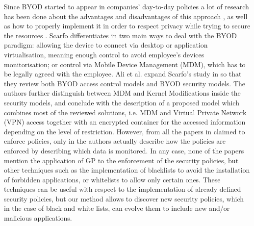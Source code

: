 \documentclass[a4paper,10pt,twocolumn,preprint,3p]{elsarticle}
\begin{document}
Since BYOD started to appear in companies' day-to-day policies  a lot
of research has been done about the advantages and disadvantages of
this approach \cite{singh2012byod}, as well as how to properly implement it in order to
respect privacy while trying to secure the resources \cite{scarfo2012new, ali2015analysis, de2015corporate}. %
 Scarfo differentiates in \cite{scarfo2012new} two main ways to deal with the BYOD paradigm: allowing the device to connect via desktop or application virtualisation, meaning enough control to avoid employee's devices monitorisation; or control via Mobile Device Management (MDM), which has to be legally agreed with the employee. Ali et al. expand Scarfo's study in \cite{ali2015analysis} so that they review both BYOD access control models and BYOD security models. The authors further distinguish between MDM and Kernel Modifications inside the security models, and conclude with the description of a proposed model which combines most of the reviewed solutions, i.e. MDM and Virtual Private Network (VPN) access together with an encrypted container for the accessed information depending on the level of restriction. However, from all the papers in \cite{ali2015analysis} claimed to enforce policies, only in \cite{rhee2013high} the authors actually describe how the policies are enforced by describing which data is monitored. In any case, none of the papers mention the application of GP to the enforcement of the security policies, but other techniques such as the implementation of blacklists to avoid the installation of forbidden applications, or whitelists to allow only certain ones. These techniques can be useful with respect to the implementation of already defined security policies, but our method allows to discover new security policies, which in the case of black and white lists, can evolve them to include new and/or malicious applications.
\end{document}
